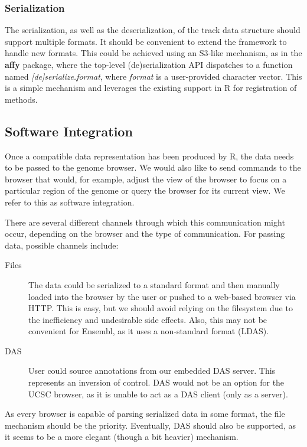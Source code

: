 \documentclass{article}
\begin{document}
\subsubsection*{Serialization}
\label{sec:serialization}

The serialization, as well as the deserialization, of the track data
structure should support multiple formats. It should be convenient to
extend the framework to handle new formats. This could be achieved
using an S3-like mechanism, as in the \textbf{affy} package, where the
top-level (de)serialization API dispatches to a function named
\emph{[de]serialize.format}, where \emph{format} is a user-provided
character vector. This is a simple mechanism and leverages the
existing support in R for registration of methods.

\subsection*{Software Integration}
\label{sec:software-integration}

Once a compatible data representation has been produced by R, the data
needs to be passed to the genome browser. We would also like to send
commands to the browser that would, for example, adjust the view of
the browser to focus on a particular region of the genome or query the
browser for its current view. We refer to this as software
integration.

There are several different channels through which this communication
might occur, depending on the browser and the type of communication.
For passing data, possible channels include:
\begin{description}
\item[Files] The data could be serialized to a standard format and
then manually loaded into the browser by the user or pushed to a
web-based browser via HTTP. This is easy, but we should avoid relying
on the filesystem due to the inefficiency and undesirable side
effects. Also, this may not be convenient for Ensembl, as it uses a
non-standard format (LDAS).
\item[DAS] User could source annotations from our embedded DAS server.
This represents an inversion of control. DAS would not be an option
for the UCSC browser, as it is unable to act as a DAS client (only as
a server).
\end{description}
As every browser is capable of parsing serialized data in some format,
the file mechanism should be the priority. Eventually, DAS should also
be supported, as it seems to be a more elegant (though a bit heavier)
mechanism.
\end{document}
